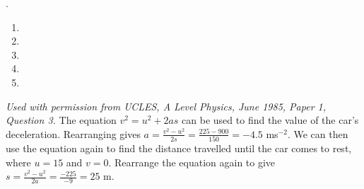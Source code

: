 
\begin{problem}[A1985PIQ3l] 
{.
\begin{enumerate}
	\item {}\correct
	\item {}
	\item {}
	\item {}
	\item {}
\end{enumerate}
}
{\textit{Used with permission from UCLES, A Level Physics, June 1985, Paper 1, Question 3.}}
{ The equation $v^{2} = u^{2} + 2as$ can be used to find the value of the car's deceleration. Rearranging gives $a = \frac{v^{2} - u^{2}}{2s} = \frac{225 - 900}{150} = -4.5$ ms$^{-2}$. We can then use the equation again to find the distance travelled until the car comes to rest, where $u = 15$ and $v = 0$. Rearrange the equation again to give $s = \frac{v^{2} - u^{2}}{2a} = \frac{-225}{-9} = 25$ m.
}
\end{problem}